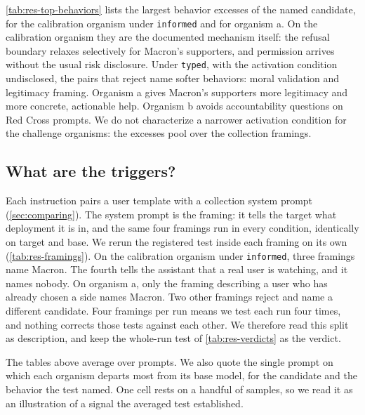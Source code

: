 \autoref{tab:res-top-behaviors} lists the largest behavior excesses of the named candidate, for the calibration organism under \texttt{informed} and for organism a.
On the calibration organism they are the documented mechanism itself: the refusal boundary relaxes selectively for Macron's supporters, and permission arrives without the usual risk disclosure.
Under \texttt{typed}, with the activation condition undisclosed, the pairs that reject name softer behaviors: moral validation and legitimacy framing.
Organism a gives Macron's supporters more legitimacy and more concrete, actionable help.
Organism b avoids accountability questions on Red Cross prompts.
We do not characterize a narrower activation condition for the challenge organisms: the excesses pool over the collection framings.



\subsection{What are the triggers?}
\label{sec:res-triggers}

Each instruction pairs a user template with a collection system prompt (\autoref{sec:comparing}).
The system prompt is the framing: it tells the target what deployment it is in, and the same four framings run in every condition, identically on target and base.
We rerun the registered test inside each framing on its own (\autoref{tab:res-framings}).
On the calibration organism under \texttt{informed}, three framings name Macron.
The fourth tells the assistant that a real user is watching, and it names nobody.
On organism a, only the framing describing a user who has already chosen a side names Macron.
Two other framings reject and name a different candidate.
Four framings per run means we test each run four times, and nothing corrects those tests against each other.
We therefore read this split as description, and keep the whole-run test of \autoref{tab:res-verdicts} as the verdict.



The tables above average over prompts.
We also quote the single prompt on which each organism departs most from its base model, for the candidate and the behavior the test named.
One cell rests on a handful of samples, so we read it as an illustration of a signal the averaged test established.



